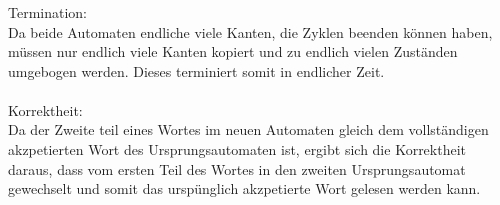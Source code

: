 \documentclass[a4paper,12pt]{scrartcl}
\begin{document}
\subsubsection{}
Termination:\\
Da beide Automaten endliche viele Kanten, die Zyklen beenden können haben, 
müssen nur endlich viele Kanten kopiert und zu endlich vielen Zuständen 
umgebogen werden. Dieses terminiert somit in endlicher Zeit.
\\\\
Korrektheit:\\
Da der Zweite teil eines Wortes im neuen Automaten gleich dem vollständigen akzpetierten Wort des Ursprungsautomaten ist, ergibt sich die Korrektheit daraus, dass vom ersten Teil des Wortes in den zweiten Ursprungsautomat gewechselt und somit das urspünglich akzpetierte Wort gelesen werden kann.  
\end{document}
